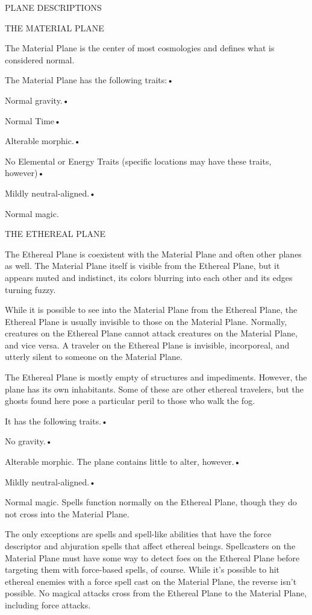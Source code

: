\documentclass{article}
\begin{document}
\vspace{12pt}
{\huge{}PLANE DESCRIPTIONS}

\vspace{12pt}
THE MATERIAL PLANE

The Material Plane is the center of most cosmologies and defines what is considered 
normal.

The Material Plane has the following traits:• 

\parindent=3pt
Normal gravity.• 

Normal Time• 

\parindent=7pt
Alterable morphic.• 

\parindent=3pt
No Elemental or Energy Traits (specific locations may have these traits, however)• 

Mildly neutral-aligned.• 

\parindent=7pt
Normal magic. 

\vspace{12pt}
\parindent=0pt
THE ETHEREAL PLANE

The Ethereal Plane is coexistent with the Material Plane and often other planes 
as well. The Material Plane itself is visible from the Ethereal Plane, but it appears 
muted and indistinct, its colors blurring into each other and its edges turning 
fuzzy.

While it is possible to see into the Material Plane from the Ethereal Plane, the 
Ethereal Plane is usually invisible to those on the Material Plane. Normally, creatures 
on the Ethereal Plane cannot attack creatures on the Material Plane, and vice versa. 
A traveler on the Ethereal Plane is invisible, incorporeal, and utterly silent 
to someone on the Material Plane. 

The Ethereal Plane is mostly empty of structures and impediments. However, the 
plane has its own inhabitants. Some of these are other ethereal travelers, but 
the ghosts found here pose a particular peril to those who walk the fog. 

It has the following traits.• 

\parindent=3pt
No gravity.• 

Alterable morphic. The plane contains little to alter, however.• 

\parindent=7pt
Mildly neutral-aligned.• 

\parindent=3pt
Normal magic. Spells function normally on the Ethereal Plane, though they do not 
cross into the Material Plane. 

\parindent=0pt
The only exceptions are spells and spell-like abilities that have the force descriptor 
and abjuration spells that affect ethereal beings. Spellcasters on the Material 
Plane must have some way to detect foes on the Ethereal Plane before targeting 
them with force-based spells, of course. While it's possible to hit ethereal enemies 
with a force spell cast on the Material Plane, the reverse isn't possible. No magical 
attacks cross from the Ethereal Plane to the Material Plane, including force attacks.
\end{document}
